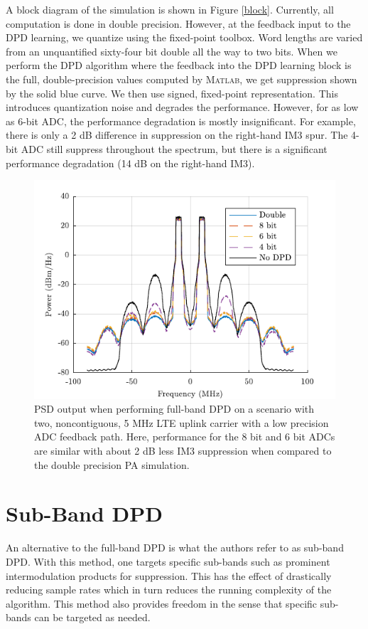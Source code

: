\documentclass[conference]{IEEEtran}
\begin{document}
A block diagram of the simulation is shown in Figure \ref{block}. Currently, all computation is done in double precision. However, at the feedback input to the DPD learning, we quantize using the fixed-point toolbox. Word lengths are varied from an unquantified sixty-four bit double all the way to two bits. When we perform the DPD algorithm where the feedback into the DPD learning block is the full, double-precision values computed by \textsc{Matlab}, we get suppression shown by the solid blue curve. We then use signed, fixed-point representation. This introduces quantization noise and degrades the performance. However, for as low as 6-bit ADC, the performance degradation is mostly insignificant. For example, there is only a 2 dB difference in suppression on the right-hand IM3 spur. The 4-bit ADC still suppress throughout the spectrum, but there is a significant performance degradation (14 dB on the right-hand IM3). 


\begin{figure}[]
\centering
\includegraphics[]{FullBandPSD}
\caption{PSD output when performing full-band DPD on a scenario with two, noncontiguous, 5 MHz LTE uplink carrier with a low precision ADC feedback path. Here, performance for the 8 bit and 6 bit ADCs are similar with about 2 dB less IM3 suppression when compared to the double precision PA simulation.}
\label{fullbandpsd}
\end{figure}


\section{Sub-Band DPD}
An alternative to the full-band DPD is what the authors refer to as sub-band DPD. 
With this method, one targets specific sub-bands such as prominent intermodulation products for suppression. 
This has the effect of drastically reducing sample rates which in turn reduces the running complexity of the algorithm. 
This method also provides freedom in the sense that specific sub-bands can be targeted as needed. 
\end{document}
